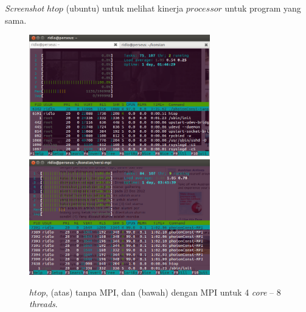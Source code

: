 \documentclass[paper=a4, fontsize=11pt]{scrartcl}
\numberwithin{equation}{section} %
\numberwithin{figure}{section} %
\numberwithin{table}{section} %
\begin{document}
\textit{Screenshot} $htop$ (ubuntu) untuk melihat kinerja $processor$ untuk program yang sama.
\begin{figure}
	\centering
	\includegraphics[width=0.7\textwidth]{htop-konstan-tanpaMPI.png}\\
	\includegraphics[width=0.7\textwidth]{htop-konstan-MPI.png}
	\caption{$htop$, (atas) tanpa MPI, dan (bawah) dengan MPI untuk 4 \textit{core} \--- 8 \textit{threads}.}
\end{figure}
\end{document}

